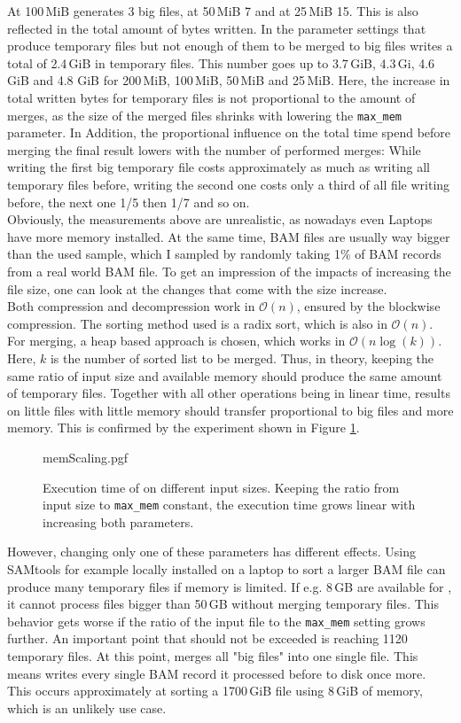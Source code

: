 At 100\,MiB \sort generates 3 big files, at 50\,MiB 7 and at 25\,MiB 15. This is also reflected in the total amount of bytes written. In the parameter settings that produce temporary files but not enough of them to be merged to big files \sort writes a total of 2.4\,GiB in temporary files. This number goes up to 3.7\,GiB, 4.3\,Gi, 4.6\,GiB and 4.8 GiB for 200\,MiB, 100\,MiB, 50\,MiB and 25\,MiB. Here, the increase in total written bytes for temporary files is not proportional to the amount of merges, as the size of the merged files shrinks with lowering the \texttt{max\_mem} parameter. In Addition, the proportional influence on the total time spend before merging the final result lowers with the number of performed merges: While writing the first big temporary file costs approximately as much as writing all temporary files before, writing the second one costs only a third of all file writing before, the next one 1/5 then 1/7 and so on.\\
Obviously, the measurements above are unrealistic, as nowadays even Laptops have more memory installed. At the same time, BAM files are usually way bigger than the used sample, which I sampled by randomly taking 1\% of BAM records from a real world BAM file. To get an impression of the impacts of increasing the file size, one can look at the changes that come with the size increase. \\
Both compression and decompression work in $\mathcal{O}(n)$, ensured by the blockwise compression. The sorting method used is a radix sort, which is also in $\mathcal{O}(n)$. For merging, a heap based approach is chosen, which works in $\mathcal{O}(n \log(k))$. Here, $k$ is the number of sorted list to be merged. Thus, in theory, keeping the same ratio of input size and available memory should produce the same amount of temporary files. Together with all other operations being in linear time, results on little files with little memory should transfer proportional to big files and more memory. This is confirmed by the experiment shown in Figure \ref{fig:memScaling}.\\
\begin{figure}
        {memScaling.pgf}
    \caption{Execution time of \sort on different input sizes. Keeping the ratio from input size to \texttt{max\_mem} constant, the execution time grows linear with increasing both parameters.}
    \label{fig:memScaling}
\end{figure}
However, changing only one of these parameters has different effects. Using SAMtools for example locally installed on a laptop to sort a larger BAM file can produce many temporary files if memory is limited. If e.g. 8\,GB are available for \sort, it cannot process files bigger than 50\,GB without merging temporary files. This behavior gets worse if the ratio of the input file to the \texttt{max\_mem} setting grows further. An important point that should not be exceeded is reaching 1120 temporary files. At this point, \sort merges all "big files" into one single file. This means \sort writes every single BAM record it processed before to disk once more. This occurs approximately at sorting a 1700\,GiB file using 8\,GiB of memory, which is an unlikely use case. \\
